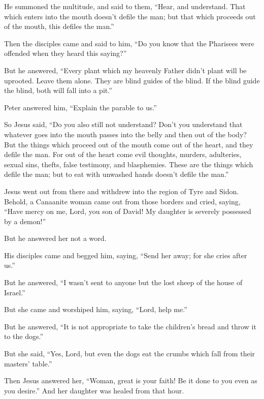  He summoned the multitude, and said to them, ``Hear, and
understand.  That which enters into the mouth doesn't
defile the man; but that which proceeds out of the mouth, this defiles
the man.''

 Then the disciples came and said to him, ``Do you know
that the Pharisees were offended when they heard this saying?''

 But he answered, ``Every plant which my heavenly Father
didn't plant will be uprooted.  Leave them alone. They are
blind guides of the blind. If the blind guide the blind, both will fall
into a pit.''

 Peter answered him, ``Explain the parable to us.''

 So Jesus said, ``Do you also still not understand?
 Don't you understand that whatever goes into the mouth
passes into the belly and then out of the body?  But the
things which proceed out of the mouth come out of the heart, and they
defile the man.  For out of the heart come evil thoughts,
murders, adulteries, sexual sins, thefts, false testimony, and
blasphemies.  These are the things which defile the man;
but to eat with unwashed hands doesn't defile the man.''

 Jesus went out from there and withdrew into the region of
Tyre and Sidon.  Behold, a Canaanite woman came out from
those borders and cried, saying, ``Have mercy on me, Lord, you son of
David! My daughter is severely possessed by a demon!''

 But he answered her not a word.

His disciples came and begged him, saying, ``Send her away; for she
cries after us.''

 But he answered, ``I wasn't sent to anyone but the lost
sheep of the house of Israel.''

 But she came and worshiped him, saying, ``Lord, help me.''

 But he answered, ``It is not appropriate to take the
children's bread and throw it to the dogs.''

 But she said, ``Yes, Lord, but even the dogs eat the
crumbs which fall from their masters' table.''

 Then Jesus answered her, ``Woman, great is your faith! Be
it done to you even as you desire.'' And her daughter was healed from
that hour.

